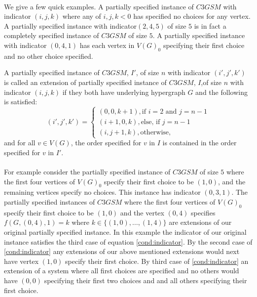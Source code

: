 \paragraph{}
We give a few quick examples. A partially specified instance of $C3GSM$ with indicator $(i,j,k)$ where any of $i,j,k <0$ has specified no choices for any vertex. A partially specified instance with indicator$(2,4,5)$ of size $5$ is in fact a completely specified instance of $C3GSM$ of size $5$. A partially specified instance with indicator $(0,4,1)$ has each vertex in $V(G)_0$ specifying their first choice and no other choice specified.
\begin{definition}
A partially specified instance of $C3GSM$, $I'$, of size $n$ with indicator $(i',j',k')$ is called an extension of partially specified instance of $C3GSM$, $I$,of size $n$ with indicator $(i,j,k)$ if  they both have underlying hypergraph $G$ and the following is satisfied:
\begin{equation} \label{cond:indicator}
(i',j',k') = \begin{cases}
(0,0,k+1), \text{if $i=2$ and $j=n-1$} \\
(i+1, 0, k), \text{else, if $j = n-1$} \\
(i,j+1, k), \text{otherwise},
\end{cases}
\end{equation}
and for all $v \in V(G)$, the order specified for $v$  in $I$ is contained in the order specified for $v$ in $I'$.
\end{definition}
\paragraph{}
For example consider the partially specified instance of $C3GSM$ of size $5$ where the first four vertices of $V(G)_0$ specify their first choice to be $(1,0)$, and the remaining vertices specify no choices. This instance has indicator $(0,3,1)$. The partially specified instances of $C3GSM$ where the first four vertices of $V(G)_0$ specify their first choice to be $(1,0)$ and the vertex $(0,4)$ specifies $f(G,(0,4),1) = k$ where $k \in \{(1,0), \dots, (1,4)\}$ are extensions of our original partially specified instance. In this example the indicator of our original instance satisfies the third case of equation \ref{cond:indicator}. By the second case of \ref{cond:indicator} any extensions of our above mentioned extensions would next have vertex $(1,0)$ specify their first choice. By third case of \ref{cond:indicator} an extension of a system where all first choices are specified and no others would have $(0,0)$ specifying their first two choices and and all others specifying their first choice.
